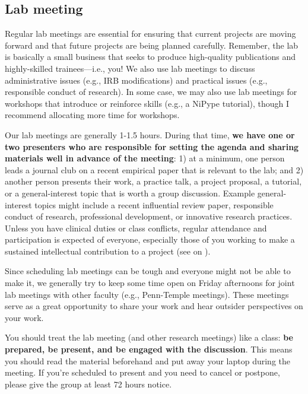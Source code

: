 \documentclass[letterpaper,12pt,oneside]{memoir}
\begin{document}
\subsection{Lab meeting}
Regular lab meetings are essential for ensuring that current projects are moving forward and that future projects are being planned carefully. Remember, the lab is basically a small business that seeks to produce high-quality publications and highly-skilled trainees---i.e., you! We also use lab meetings to discuss administrative issues (e.g., IRB modifications) and practical issues (e.g., responsible conduct of research). In some case, we may also use lab meetings for workshops that introduce or reinforce skills (e.g., a NiPype tutorial), though I recommend allocating more time for workshops. 

Our lab meetings are generally 1-1.5 hours. During that time, \textbf{we have one or two presenters who are responsible for setting the agenda and sharing materials well in advance of the meeting}: 1) at a minimum, one person leads a journal club on a recent empirical paper that is relevant to the lab; and 2) another person presents their work, a practice talk, a project proposal, a tutorial, or a general-interest topic that is worth a group discussion. Example general-interest topics might include a recent influential review paper, responsible conduct of research, professional development, or innovative research practices. Unless you have clinical duties or class conflicts, regular attendance and participation is expected of everyone, especially those of you working to make a sustained intellectual contribution to a project (see  on ).

Since scheduling lab meetings can be tough and everyone might not be able to make it, we generally try to keep some time open on Friday afternoons for joint lab meetings with other faculty (e.g., Penn-Temple meetings). These meetings serve as a great opportunity to share your work and hear outsider perspectives on your work. 

You should treat the lab meeting (and other research meetings) like a class: \textbf{be prepared, be present, and be engaged with the discussion}. This means you should read the material beforehand and put away your laptop during the meeting. If you're scheduled to present and you need to cancel or postpone, please give the group at least 72 hours notice. 
\end{document}
